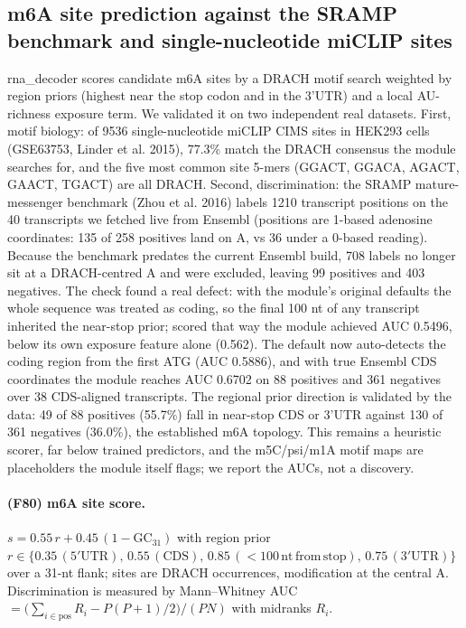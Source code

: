 \subsection{m6A site prediction against the SRAMP benchmark and single-nucleotide miCLIP sites}
rna\_decoder scores candidate m6A sites by a DRACH motif search weighted by region priors (highest near the stop codon and in the 3'UTR) and a local AU-richness exposure term. We validated it on two independent real datasets. First, motif biology: of 9536 single-nucleotide miCLIP CIMS sites in HEK293 cells (GSE63753, Linder et al. 2015), 77.3\% match the DRACH consensus the module searches for, and the five most common site 5-mers (GGACT, GGACA, AGACT, GAACT, TGACT) are all DRACH. Second, discrimination: the SRAMP mature-messenger benchmark (Zhou et al. 2016) labels 1210 transcript positions on the 40 transcripts we fetched live from Ensembl (positions are 1-based adenosine coordinates: 135 of 258 positives land on A, vs 36 under a 0-based reading). Because the benchmark predates the current Ensembl build, 708 labels no longer sit at a DRACH-centred A and were excluded, leaving 99 positives and 403 negatives. The check found a real defect: with the module's original defaults the whole sequence was treated as coding, so the final 100 nt of any transcript inherited the near-stop prior; scored that way the module achieved AUC 0.5496, below its own exposure feature alone (0.562). The default now auto-detects the coding region from the first ATG (AUC 0.5886), and with true Ensembl CDS coordinates the module reaches AUC 0.6702 on 88 positives and 361 negatives over 38 CDS-aligned transcripts. The regional prior direction is validated by the data: 49 of 88 positives (55.7\%) fall in near-stop CDS or 3'UTR against 130 of 361 negatives (36.0\%), the established m6A topology. This remains a heuristic scorer, far below trained predictors, and the m5C/psi/m1A motif maps are placeholders the module itself flags; we report the AUCs, not a discovery.
\paragraph{(F80) m6A site score.} $s=0.55\,r+0.45\,(1-\mathrm{GC}_{31})$ with region prior $r\in\{0.35\,(5\prime\mathrm{UTR}),\,0.55\,(\mathrm{CDS}),\,0.85\,(<100\,\mathrm{nt\,from\,stop}),\,0.75\,(3\prime\mathrm{UTR})\}$ over a 31-nt flank; sites are DRACH occurrences, modification at the central A. Discrimination is measured by Mann--Whitney AUC $=\big(\sum_{i\in\mathrm{pos}}R_i-P(P{+}1)/2\big)/(PN)$ with midranks $R_i$.
